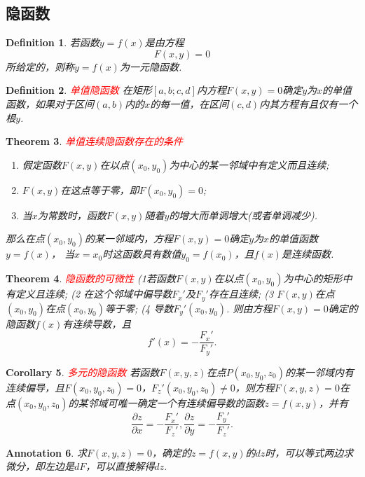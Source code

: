 \documentclass{article}
\newtheorem{theorem}{Theorem}[section]
\newtheorem{corollary}[theorem]{Corollary}
\newtheorem{definition}[theorem]{Definition}
\newtheorem{annotation}[theorem]{Annotation}
\newcommand{\redt}[1]{\textcolor{red}{#1}}
\begin{document}
\subsection{隐函数}

\begin{definition}
\rm 若函数$y=f(x)$是由方程
$$
F(x,y) = 0
$$
所给定的，则称$y=f(x)$为一元隐函数. 
\end{definition}

\begin{definition}
\rm \redt{单值隐函数} 在矩形$[a,b;c,d]$内方程$F(x,y)=0$确定$y$为$x$的单值函数，如果对于区间$(a,b)$内的$x$的每一值，在区间$(c,d)$内其方程有且仅有一个根$y$. 
\end{definition}

\begin{theorem}
\rm \redt{单值连续隐函数存在的条件}
\begin{enumerate}
	\item 假定函数$F(x,y)$在以点$(x_0,y_0)$为中心的某一邻域中有定义而且连续; 
	\item $F(x,y)$在这点等于零，即$F(x_0,y_0)=0$;
	\item 当$x$为常数时，函数$F(x,y)$随着$y$的增大而单调增大(或者单调减少).
\end{enumerate}
那么在点$(x_0,y_0)$的某一邻域内，方程$F(x,y)=0$确定$y$为$x$的单值函数$y=f(x)$， 当$x=x_0$时这函数具有数值$y_0 = f(x_0)$，且$f(x)$是连续函数. 
\end{theorem}

\begin{theorem}
\rm \redt{隐函数的可微性} (1若函数$F(x,y)$在以点$(x_0,y_0)$为中心的矩形中有定义且连续; (2 在这个邻域中偏导数$F_x'$及$F_y'$存在且连续; (3 $F(x,y)$在点$(x_0,y_0)$在点$(x_0,y_0)$等于零; (4 导数$F_y'(x_0,y_0)$. 则由方程$F(x,y)=0$确定的隐函数$f(x)$有连续导数，且
$$
f'(x) = -\frac{F_x'}{F_y'}.
$$ 
\end{theorem}

\begin{corollary}
\rm \redt{多元的隐函数} 若函数$F(x,y,z)$在点$P(x_0,y_0,z_0)$的某一邻域内有连续偏导，且$F(x_0,y_0,z_0)=0$，$F_z'(x_0,y_0,z_0)\neq 0$，则方程$F(x,y,z)=0$在点$(x_0,y_0,z_0)$的某邻域可唯一确定一个有连续偏导数的函数$z=f(x,y)$，并有
$$
\frac{\partial z}{\partial x} = -\frac{F_x'}{F_z'}, \frac{\partial z}{\partial y} = -\frac{F_y'}{F_z'}.
$$
\end{corollary}

\begin{annotation}
\rm 求$F(x,y,z)=0$，确定的$z=f(x,y)$的$dz$时，可以等式两边求微分，即左边是$dF$，可以直接解得$dz$. 
\end{annotation}
\end{document}
